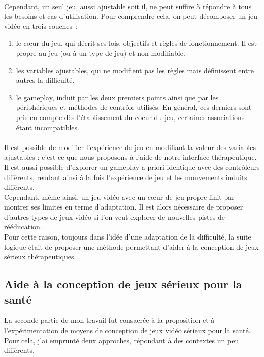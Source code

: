 \paragraph{}
Cependant, un seul jeu, aussi ajustable soit il, ne peut suffire à répondre à tous les besoins et cas d'utilisation. Pour comprendre cela, on peut décomposer un jeu vidéo en trois couches~:
\begin{enumerate}
	\item le cœur du jeu, qui décrit ses lois, objectifs et règles de fonctionnement. Il est propre au jeu (ou à un type de jeu) et non modifiable.
	\item les variables ajustables, qui ne modifient pas les règles mais définissent entre autres la difficulté.
	\item le gameplay, induit par les deux premiers points ainsi que par les périphériques et méthodes de contrôle utilisés. En général, ces derniers sont pris en compte dès l'établissement du coeur du jeu, certaines associations étant incompatibles.
\end{enumerate}
\paragraph{}
Il est possible de modifier l'expérience de jeu en modifiant la valeur des variables ajustables : c'est ce que nous proposons à l'aide de notre interface thérapeutique. Il est aussi possible d'explorer un gameplay a priori identique avec des contrôleurs différents, rendant ainsi à la fois l'expérience de jeu et les mouvements induits différents.
\\Cependant, même ainsi, un jeu vidéo avec un cœur de jeu propre finit par montrer ses limites en terme d'adaptation. Il est alors nécessaire de proposer d'autres types de jeux vidéo si l'on veut explorer de nouvelles pistes de rééducation.\\
Pour cette raison, toujours dans l'idée d'une adaptation de la difficulté, la suite logique était de proposer une méthode permettant d'aider à la conception de jeux sérieux thérapeutiques.
 
 \subsection{Aide à la conception de jeux sérieux pour la santé}
	La seconde partie de mon travail fut consacrée à la proposition et à l'expérimentation de moyens de conception de jeux vidéo sérieux pour la santé. Pour cela, j'ai emprunté deux approches, répondant à des contextes un peu différents.
	
